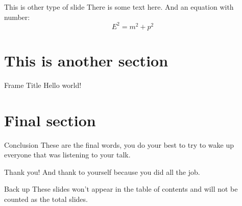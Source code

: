 \documentclass{article}
\begin{document}
\begin{frame}[standout]{This is other type of slide}
There is some text here.
And an equation with number:
\begin{equation}
    E^{2} = m^{2} + p^{2}
\end{equation}
\end{frame}



\section{This is another section}
\begin{frame}{Frame Title} %
    Hello world!
\end{frame}

\section{Final section}

\begin{frame}{Conclusion}
    These are the final words, you do your best to try to wake up everyone that was listening to your talk.
\end{frame}

{ %
\begin{frame}[standout]
  Thank you! And thank to yourself because you did all the job. 
\end{frame}
}


\begin{frame}{Back up}
    These slides won't appear in the table of contents and will not be counted as the total slides.
\end{frame}
\end{document}
